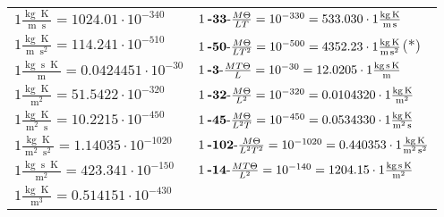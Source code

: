 \begin{center}
\begin{longtable}{l l}
{\color{black}$1 \bm{\mathrm{ }}\frac{\operatorname{kg}\operatorname{K}}{\operatorname{m}\operatorname{s}} = 1024.01\cdot10^{-340} $}&
	{\color{black}$1\:\text{\textbf{-33}-} \frac{M\Theta}{LT}=10^{-330} = 533.030 \cdot 1 \bm{\mathrm{ }}\frac{\operatorname{kg}\operatorname{K}}{\operatorname{m}\operatorname{s}}$}\\
{\color{black}$1 \bm{\mathrm{ }}\frac{\operatorname{kg}\operatorname{K}}{\operatorname{m}\operatorname{s}^2} = 114.241\cdot10^{-510} $}&
	{\color{black}$1\:\text{\textbf{-50}-} \frac{M\Theta}{LT^2}=10^{-500} = 4352.23 \cdot 1 \bm{\mathrm{ }}\frac{\operatorname{kg}\operatorname{K}}{\operatorname{m}\operatorname{s}^2}$}\quad(*)\\
{\color{black}$1 \bm{\mathrm{ }}\frac{\operatorname{kg}\operatorname{s}\operatorname{K}}{\operatorname{m}} = 0.0424451\cdot10^{-30} $}&
	{\color{black}$1\:\text{\textbf{-3}-} \frac{MT\Theta}{L}=10^{-30} = 12.0205 \cdot 1 \bm{\mathrm{ }}\frac{\operatorname{kg}\operatorname{s}\operatorname{K}}{\operatorname{m}}$}\\
{\color{black}$1 \bm{\mathrm{ }}\frac{\operatorname{kg}\operatorname{K}}{\operatorname{m}^2} = 51.5422\cdot10^{-320} $}&
	{\color{black}$1\:\text{\textbf{-32}-} \frac{M\Theta}{L^2}=10^{-320} = 0.0104320 \cdot 1 \bm{\mathrm{ }}\frac{\operatorname{kg}\operatorname{K}}{\operatorname{m}^2}$}\\
{\color{black}$1 \bm{\mathrm{ }}\frac{\operatorname{kg}\operatorname{K}}{\operatorname{m}^2\operatorname{s}} = 10.2215\cdot10^{-450} $}&
	{\color{black}$1\:\text{\textbf{-45}-} \frac{M\Theta}{L^2T}=10^{-450} = 0.0534330 \cdot 1 \bm{\mathrm{ }}\frac{\operatorname{kg}\operatorname{K}}{\operatorname{m}^2\operatorname{s}}$}\\
{\color{black}$1 \bm{\mathrm{ }}\frac{\operatorname{kg}\operatorname{K}}{\operatorname{m}^2\operatorname{s}^2} = 1.14035\cdot10^{-1020} $}&
	{\color{black}$1\:\text{\textbf{-102}-} \frac{M\Theta}{L^2T^2}=10^{-1020} = 0.440353 \cdot 1 \bm{\mathrm{ }}\frac{\operatorname{kg}\operatorname{K}}{\operatorname{m}^2\operatorname{s}^2}$}\\
{\color{black}$1 \bm{\mathrm{ }}\frac{\operatorname{kg}\operatorname{s}\operatorname{K}}{\operatorname{m}^2} = 423.341\cdot10^{-150} $}&
	{\color{black}$1\:\text{\textbf{-14}-} \frac{MT\Theta}{L^2}=10^{-140} = 1204.15 \cdot 1 \bm{\mathrm{ }}\frac{\operatorname{kg}\operatorname{s}\operatorname{K}}{\operatorname{m}^2}$}\\
{\color{black}$1 \bm{\mathrm{ }}\frac{\operatorname{kg}\operatorname{K}}{\operatorname{m}^3} = 0.514151\cdot10^{-430} $}&

\end{longtable}
\end{center}
